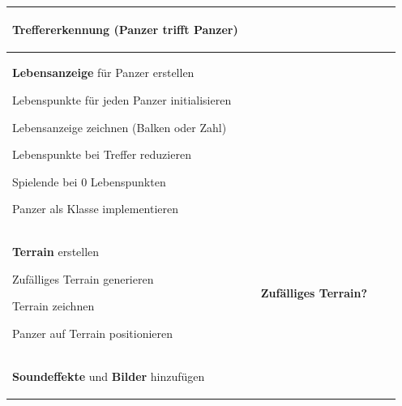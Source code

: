 \begin{landscape}
\begin{longtable}{p{11cm}|p{3cm}|p{3cm}|p{4cm}|p{4cm}}
\begin{todolist}
\begin{todolist}
                \item Treffererkennung (Panzer trifft Panzer)
            \end{todolist}
        \end{todolist}               &                                        &                                                            &                          &                                                         \\
        \hline
        \begin{todolist}
            \item \textbf{Lebensanzeige} für Panzer erstellen
            \begin{todolist}
                \item Lebenspunkte für jeden Panzer initialisieren
                \item Lebensanzeige zeichnen (Balken oder Zahl)
                \item Lebenspunkte bei Treffer reduzieren
                \item Spielende bei 0 Lebenspunkten
                \item Panzer als Klasse implementieren
            \end{todolist}
        \end{todolist}          &                                        &                                                            &                          &                                                              \\
        \hline
        \begin{todolist}
            \item \textbf{Terrain} erstellen
            \begin{todolist}
                \item Zufälliges Terrain generieren
                \item Terrain zeichnen
                \item Panzer auf Terrain positionieren
            \end{todolist}
        \end{todolist}                           &                                        & \textbf{Zufälliges Terrain?}                               &                          &                                             \\
        \hline
        \begin{todolist}
            \item \textbf{Soundeffekte} und \textbf{Bilder} hinzufügen

\end{todolist}
\end{longtable}
\end{landscape}
